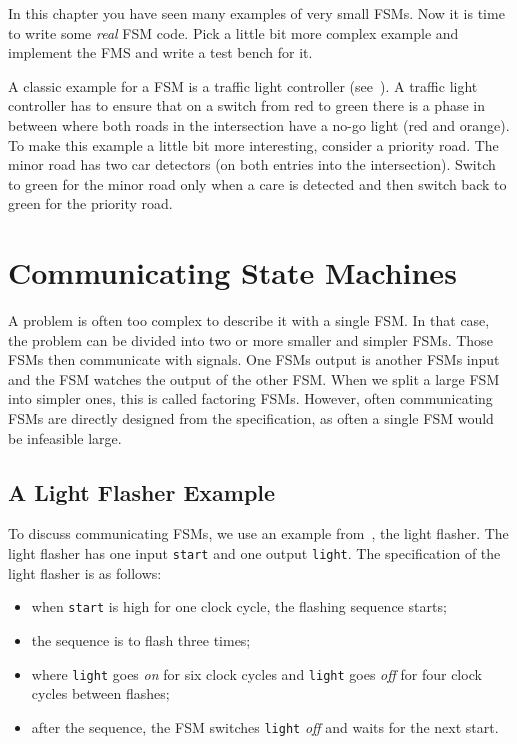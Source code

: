 \documentclass[%
    10pt,
    headinclude, footexclude,
    openright, %
    notitlepage,
    cleardoubleempty,
    headsepline,
    pointlessnumbers,
    bibtotoc, idxtotoc,
    ]{scrbook}
\newcommand{\code}[1]{{\small{\texttt{#1}}}}
\begin{document}
In this chapter you have seen many examples of very small FSMs.
Now it is time to write some \emph{real} FSM code.
Pick a little bit more complex example and implement the FMS and
write a test bench for it.

A classic example for a FSM is a traffic light controller (see~\cite[Section~14.3]{dally:vhdl:2016}).
A traffic light controller has to ensure that on a switch from red to green
there is a phase in between where both roads in the intersection
have a no-go light (red and orange).
To make this example a little bit more interesting, consider a priority road.
The minor road has two car detectors (on both entries into the intersection).
Switch to green for the minor road only when a care is detected and then switch
back to green for the priority road.

\chapter{Communicating State Machines}

A problem is often too complex to describe it with a single FSM.
In that case, the problem can be divided into two or more smaller and simpler FSMs.
Those FSMs then communicate with signals. One FSMs output is
another FSMs input and the FSM watches the output of the other FSM.
When we split a large FSM into simpler ones, this is called factoring FSMs.
However, often communicating FSMs are directly designed from the specification,
as often a single FSM would be infeasible large.

\section{A Light Flasher Example}

To discuss communicating FSMs, we use an example
from~\cite[Chapter~17]{dally:vhdl:2016}, the light flasher.
The light flasher has one input \code{start} and one output
\code{light}. The specification of the light flasher is as follows:
\begin{itemize}
\item when \code{start} is high for one clock cycle, the flashing
sequence starts;
\item the sequence is to flash three times;
\item where \code{light} goes \emph{on} for six clock cycles and \code{light} goes \emph{off} for four clock cycles between flashes;
\item after the sequence, the FSM switches \code{light} \emph{off} and waits
for the next start.
\end{itemize}
\end{document}
